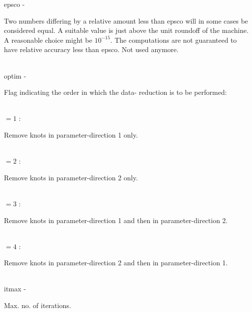        \>\>    {\fov epsco}\> - \>     \begin{minipg2}
                                Two numbers differing by a relative amount less
                                than epsco will in some cases be considered equal.
                                A suitable value is just above the unit roundoff of
                                the machine.
                                A reasonable choice might be $10^{-15}$.
                                The computations are not guaranteed to
                                have relative accuracy less than epsco.
                                Not used anymore.
                                \end{minipg2}\\[0.3ex]
        \>\>    {\fov optim}\> - \>     \begin{minipg2}
                                Flag indicating the order in which the data-
                                reduction is to be performed:
                                \end{minipg2}\\[0.3ex]
                \>\>\>\>\>      $= 1$ :\>\begin{minipg5}
                                Remove knots in parameter-direction 1 only.
                                \end{minipg5}\\[0.3ex]
                \>\>\>\>\>      $= 2$ : \>\begin{minipg5}
                                Remove knots in parameter-direction 2 only.
                                \end{minipg5}\\[0.3ex]
                \>\>\>\>\>      $= 3$ : \>\begin{minipg5}
                                        Remove knots in parameter-direction 1
                                                and then in parameter-direction 2.
                                \end{minipg5}\\[0.3ex]
                \>\>\>\>\>      $= 4$ : \>\begin{minipg5}
                                        Remove knots in parameter-direction 2
                                                and then in parameter-direction 1.
                                \end{minipg5}\\[0.3ex]
        \>\>    {\fov itmax}\> - \>     \begin{minipg2}
                                Max. no. of iterations.
                                \end{minipg2}\\
